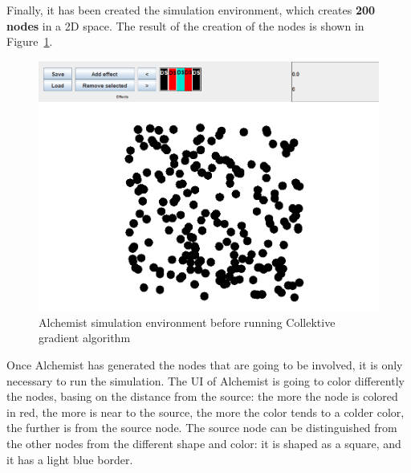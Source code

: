 Finally, it has been created the simulation environment, which creates \textbf{200 nodes} in a 2D space. The result of the creation of the nodes is shown in Figure~\ref{fig:collektive_before_running_the_simulation}.
\begin{figure}[!ht]
    \centering
    \includegraphics[scale=0.75]{document/chapters/4-collektive/images/collektive_before_running_the_simulation.png}
    \caption{Alchemist simulation environment before running Collektive gradient algorithm}
    \label{fig:collektive_before_running_the_simulation}
\end{figure}

Once Alchemist has generated the nodes that are going to be involved, it is only necessary to run the simulation. The UI of Alchemist is going to color differently the nodes, basing on the distance from the source: the more the node is colored in red, the more is near to the source, the more the color tends to a colder color, the further is from the source node.\newline
The source node can be distinguished from the other nodes from the different shape and color: it is shaped as a square, and it has a light blue border.

